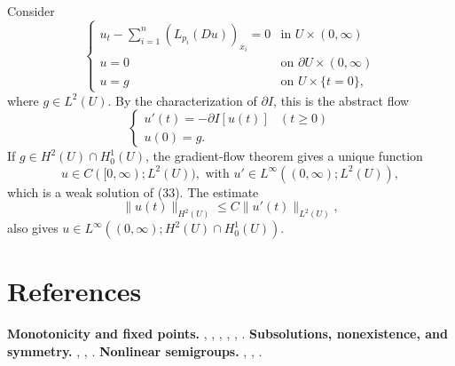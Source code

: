 \begin{example}
\label{ex:quasilinear-parabolic-gradient-flow}

Consider
\[
\begin{cases}
u_t - \sum_{i=1}^n (L_{p_i}(Du))_{x_i} = 0 & \text{in } U \times (0, \infty) \\
u = 0 & \text{on } \partial U \times (0, \infty) \\
u = g & \text{on } U \times \{t = 0\},
\end{cases}
\tag{33}
\]
where $g \in L^2(U)$. By the characterization of $\partial I$, this is the abstract flow
\[
\begin{cases} u'(t) = -\partial I[u(t)] & (t \geq 0) \\ u(0) = g. \end{cases}
\tag{34}
\]
If $g \in H^2(U) \cap H^1_0(U)$, the gradient-flow theorem gives a unique function
\[
u \in C([0,\infty); L^2(U)), \text{ with } u' \in L^\infty((0,\infty); L^2(U)),
\]
which is a weak solution of (33). The estimate
\[
\|u(t)\|_{H^2(U)} \leq C\|u'(t)\|_{L^2(U)},
\]
also gives $u \in L^\infty((0,\infty); H^2(U) \cap H^1_0(U))$.
\end{example}

\section{References}
\label{sec:references-ch9}
\textbf{Monotonicity and fixed points.} \cite{Lions1969}, \cite{Zeidler1985}, \cite{Evans1990}, \cite{Zeidler1985}, \cite{GilbargTrudinger1983}, \cite{GilbargTrudinger1983}.
\textbf{Subsolutions, nonexistence, and symmetry.} \cite{Smoller1983}, \cite{Payne1975}, \cite{GidasNiNirenberg1979}.
\textbf{Nonlinear semigroups.} \cite{Brezis1973}, \cite{Barbu1976}, \cite{Zeidler1985}.
